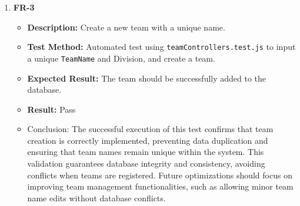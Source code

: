 \documentclass[12pt, titlepage]{article}
\begin{document}
\begin{enumerate}
        \item \textbf{FR-3}
        \begin{itemize}
            \item \textbf{Description:} Create a new team with a unique name.
            \item \textbf{Test Method:} Automated test using \texttt{teamControllers.test.js} to input a unique \texttt{TeamName} and Division, and create a team.
            \item \textbf{Expected Result:} The team should be successfully added to the database.
            \item \textbf{Result:} Pass
            \item Conclusion: The successful execution of this test confirms that team creation is correctly implemented, preventing data duplication and ensuring that team names remain unique within the system.
			This validation guarantees database integrity and consistency, avoiding conflicts when teams are registered. Future optimizations should focus on improving team management functionalities,
			such as allowing minor team name edits without database conflicts.
        \end{itemize}


\end{enumerate}
\end{document}

